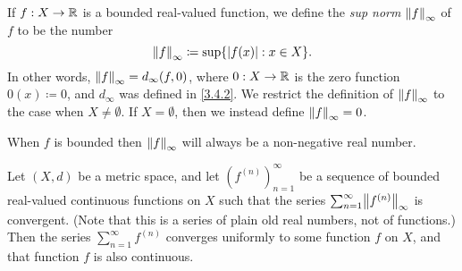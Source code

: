 \setcounter{thm}{4}
\begin{defn}\label{3.5.5}
  If \(f : X \to \R\) is a bounded real-valued function, we define the \emph{sup norm} \(\norm*{f}_\infty\) of \(f\) to be the number
  \[
    \norm*{f}_\infty \coloneqq \sup\set{\abs{f(x)} : x \in X}.
  \]
  In other words, \(\norm*{f}_\infty = d_\infty(f, 0)\), where \(0 : X \to \R\) is the zero function \(0(x) \coloneqq 0\), and \(d_\infty\) was defined in \cref{3.4.2}.
  We restrict the definition of \(\norm*{f}_\infty\) to the case when \(X \neq \emptyset\).
  If \(X = \emptyset\), then we instead define \(\norm*{f}_\infty = 0\).
\end{defn}

\begin{note}
  When \(f\) is bounded then \(\norm*{f}_\infty\) will always be a non-negative real number.
\end{note}

\setcounter{thm}{6}
\begin{thm}\label{3.5.7}
  Let \((X, d)\) be a metric space, and let \((f^{(n)})_{n = 1}^\infty\) be a sequence of bounded real-valued continuous functions on \(X\) such that the series \(\sum_{n = 1}^\infty \norm*{f^{(n)}}_\infty\) is convergent.
  (Note that this is a series of plain old real numbers, not of functions.)
  Then the series \(\sum_{n = 1}^\infty f^{(n)}\) converges uniformly to some function \(f\) on \(X\), and that function \(f\) is also continuous.
\end{thm}

